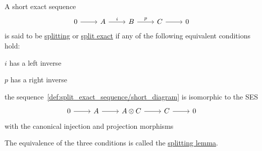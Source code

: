 \begin{definition}\label{def:split_exact_sequence}\cite{nLab:split_exact_sequence}
  A short exact sequence
  \begin{equation}\label{def:split_exact_sequence/short_diagram}
    \begin{tikzcd}[baseline=(current bounding box.center)]
      0 \arrow[r] & A \arrow[r, "i"] & B \arrow[r, "p"] & C \arrow[r] & 0
    \end{tikzcd}
  \end{equation}
  is said to be \uline{splitting} or \uline{split exact} if any of the following equivalent conditions hold:
  \begin{defenum}
    \item $i$ has a left inverse
    \item $p$ has a right inverse
    \item the sequence~\cref{def:split_exact_sequence/short_diagram} is isomorphic to the SES
    \begin{equation}\label{def:short_exact_sequence/split_diagram}
      \begin{tikzcd}[baseline=(current bounding box.center)]
        0 \arrow[r] & A \arrow[r] & A \otimes C \arrow[r] & C \arrow[r] & 0
      \end{tikzcd}
    \end{equation}
    with the canonical injection and projection morphisms
  \end{defenum}

  The equivalence of the three conditions is called the \uline{splitting lemma}.
\end{definition}

